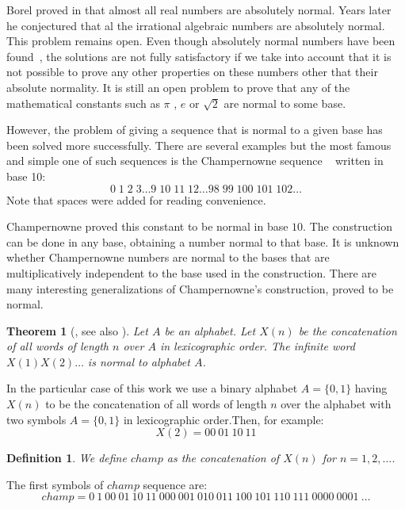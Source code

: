 \documentclass[11pt,a4paper]{tesis}
\newtheorem{theorem}{Theorem}[]
\newtheorem{definition}{Definition}[]
\begin{document}
Borel  proved in \cite{Borel} that almost all real numbers are absolutely normal. Years later 
he conjectured that al the irrational algebraic numbers are absolutely normal. 
This problem remains open.
Even though absolutely normal numbers have been found~\cite{Sierpinski,turing,BHS,FN},
 the solutions are not fully satisfactory
 if we take into account that it is not possible to prove any other properties on these numbers other that their absolute normality.
It is still an open problem to prove that any of the mathematical constants such as $\pi$ , $e$ or $\sqrt{2}$ are normal to some base.


However, the problem of giving a sequence that is normal to a given base has been solved more successfully.
 There are several examples but the most famous and simple one of such sequences is the 
Champernowne sequence ~\cite{champern} written in base 10:
$$0 \; 1 \;2 \;3 \dots 9 \; 10 \; 11 \; 12 \dots 98 \; 99 \; 100 \; 101 \; 102 \dots$$ 
Note that spaces were added for reading convenience.


Champernowne proved this constant to be normal in base $10$. 
The construction can be done in any base, obtaining a number normal to that base. It is unknown whether Champernowne numbers are normal to
the bases that are multiplicatively independent to the base used in the construction. 
There are many interesting generalizations of Champernowne's construction, proved to be normal. 
\medskip

\begin{theorem}[\cite{champern}, see also \cite{BC2018}]
    Let $A$ be an alphabet. Let $X(n)$ be the concatenation of all words of length $n$ over $A$ in lexicographic order.
     The infinite word $X(1)X(2)\dots$ is normal to alphabet $A$.
\end{theorem}

In the particular case of this work we use a binary alphabet  $A=\{0,1\}$ having $X(n)$ to be the concatenation of all words of length $n$ over the alphabet with two symbols $A=\{0,1\}$ in lexicographic order.Then, for example:
$$X(2) = 00 \: 01 \: 10 \: 11$$

\begin{definition}
We define  $champ$ as the concatenation of $X(n)$ for $n = 1,2,\dots$.
\end{definition}
The first symbols of $champ$ sequence are:
$$champ = 0 \: 1 \: 00 \: 01 \: 10 \: 11 \: 000 \: 001 \: 010 \: 011 \: 100 \: 101 \: 110 \: 111 \: 0000 \: 0001 \: \dots$$
\end{document}
